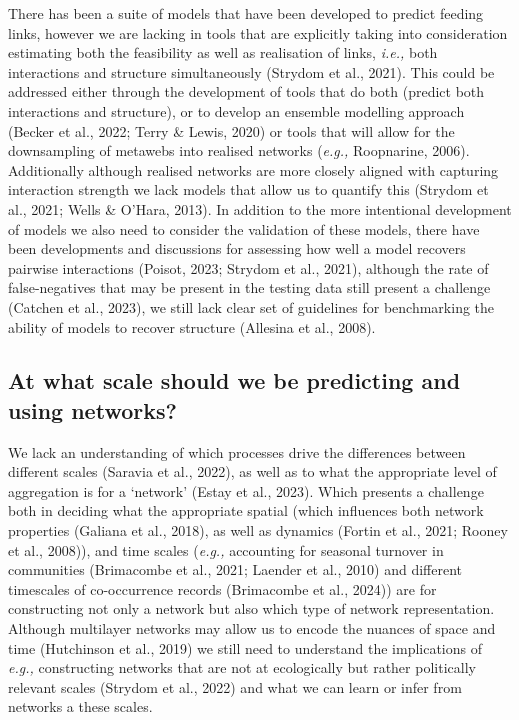 \documentclass[
]{article}
\begin{document}
There has been a suite of models that have been developed to predict
feeding links, however we are lacking in tools that are explicitly
taking into consideration estimating both the feasibility as well as
realisation of links, \emph{i.e.,} both interactions and structure
simultaneously (Strydom et al., 2021). This could be addressed either
through the development of tools that do both (predict both interactions
and structure), or to develop an ensemble modelling approach (Becker et
al., 2022; Terry \& Lewis, 2020) or tools that will allow for the
downsampling of metawebs into realised networks (\emph{e.g.,}
Roopnarine, 2006). Additionally although realised networks are more
closely aligned with capturing interaction strength we lack models that
allow us to quantify this (Strydom et al., 2021; Wells \& O'Hara, 2013).
In addition to the more intentional development of models we also need
to consider the validation of these models, there have been developments
and discussions for assessing how well a model recovers pairwise
interactions (Poisot, 2023; Strydom et al., 2021), although the rate of
false-negatives that may be present in the testing data still present a
challenge (Catchen et al., 2023), we still lack clear set of guidelines
for benchmarking the ability of models to recover structure (Allesina et
al., 2008).

\subsection{At what scale should we be predicting and using
networks?}\label{at-what-scale-should-we-be-predicting-and-using-networks}

We lack an understanding of which processes drive the differences
between different scales (Saravia et al., 2022), as well as to what the
appropriate level of aggregation is for a `network' (Estay et al.,
2023). Which presents a challenge both in deciding what the appropriate
spatial (which influences both network properties (Galiana et al.,
2018), as well as dynamics (Fortin et al., 2021; Rooney et al., 2008)),
and time scales (\emph{e.g.,} accounting for seasonal turnover in
communities (Brimacombe et al., 2021; Laender et al., 2010) and
different timescales of co-occurrence records (Brimacombe et al., 2024))
are for constructing not only a network but also which type of network
representation. Although multilayer networks may allow us to encode the
nuances of space and time (Hutchinson et al., 2019) we still need to
understand the implications of \emph{e.g.,} constructing networks that
are not at ecologically but rather politically relevant scales (Strydom
et al., 2022) and what we can learn or infer from networks a these
scales.
\end{document}
